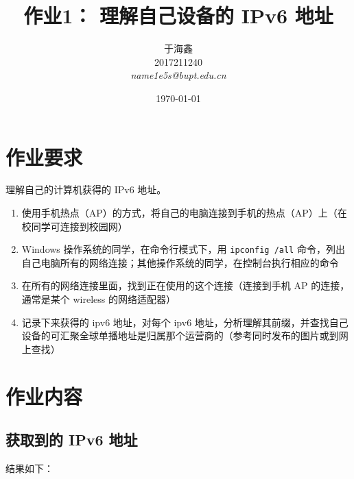 \documentclass[blue,normal,cn]{elegantnote}
\title{作业1： 理解自己设备的 IPv6 地址 }
\date{\today}
\newcommand{\code}[1]{\colorbox{light-gray}{\texttt{#1}}}
\begin{document}
\author{
	\begin{tabular}[t]{c}
		于海鑫     \\
		2017211240 \\
		\emph{name1e5s@bupt.edu.cn}
	\end{tabular}
}
\maketitle

\section{作业要求}

理解自己的计算机获得的 IPv6 地址。

\begin{enumerate}
	\item 使用手机热点（AP）的方式，将自己的电脑连接到手机的热点（AP）上（在校同学可连接到校园网）
	\item Windows 操作系统的同学，在命令行模式下，用 \code{ipconfig /all} 命令，列出自己电脑所有的网络连接；其他操作系统的同学，在控制台执行相应的命令
	\item 在所有的网络连接里面，找到正在使用的这个连接（连接到手机 AP 的连接，通常是某个 wireless 的网络适配器）
	\item 记录下来获得的 ipv6 地址，对每个 ipv6 地址，分析理解其前缀，并查找自己设备的可汇聚全球单播地址是归属那个运营商的（参考同时发布的图片或到网上查找）
\end{enumerate}

\section{作业内容}

\subsection{获取到的 IPv6 地址}

结果如下：
\end{document}
